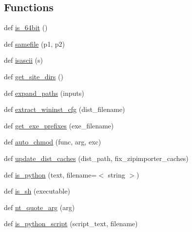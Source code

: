 \subsection*{Functions}
\begin{DoxyCompactItemize}
\item 
def \hyperlink{namespacesetuptools_1_1command_1_1easy__install_aa4ca3a8b2ff550d98b21297547692521}{is\+\_\+64bit} ()
\item 
def \hyperlink{namespacesetuptools_1_1command_1_1easy__install_aa76ea5c13ed5487e2dbf06dae0a0f8dd}{samefile} (p1, p2)
\item 
def \hyperlink{namespacesetuptools_1_1command_1_1easy__install_af861864533621706683ce8419f5e4f34}{isascii} (s)
\item 
def \hyperlink{namespacesetuptools_1_1command_1_1easy__install_a2c8e8bb7ad16bf452892898a80bc9958}{get\+\_\+site\+\_\+dirs} ()
\item 
def \hyperlink{namespacesetuptools_1_1command_1_1easy__install_af321cc50ee23f37294b5fe087369316a}{expand\+\_\+paths} (inputs)
\item 
def \hyperlink{namespacesetuptools_1_1command_1_1easy__install_a8c8767cb09f060c9420cf05d0ec4eb9c}{extract\+\_\+wininst\+\_\+cfg} (dist\+\_\+filename)
\item 
def \hyperlink{namespacesetuptools_1_1command_1_1easy__install_a98b9a3d250a24f2d7332bd586fcc0d2b}{get\+\_\+exe\+\_\+prefixes} (exe\+\_\+filename)
\item 
def \hyperlink{namespacesetuptools_1_1command_1_1easy__install_a744f4ccbe5bd43d99c471ab3b9fd0809}{auto\+\_\+chmod} (func, arg, exc)
\item 
def \hyperlink{namespacesetuptools_1_1command_1_1easy__install_ad3d06886ccd1ade947f9f6b6a3f851c0}{update\+\_\+dist\+\_\+caches} (dist\+\_\+path, fix\+\_\+zipimporter\+\_\+caches)
\item 
def \hyperlink{namespacesetuptools_1_1command_1_1easy__install_acd1aa2f7dd637039467d06ac5ce35a06}{is\+\_\+python} (text, filename=\textquotesingle{}$<$ string $>$\textquotesingle{})
\item 
def \hyperlink{namespacesetuptools_1_1command_1_1easy__install_a8eb329bf287009f97a5804721548658d}{is\+\_\+sh} (executable)
\item 
def \hyperlink{namespacesetuptools_1_1command_1_1easy__install_a663991ed6ab4d76d408857552e043e8c}{nt\+\_\+quote\+\_\+arg} (arg)
\item 
def \hyperlink{namespacesetuptools_1_1command_1_1easy__install_a6dd384c4f3471ae5d2480ccef58bb8e9}{is\+\_\+python\+\_\+script} (script\+\_\+text, filename)

\end{DoxyCompactItemize}
